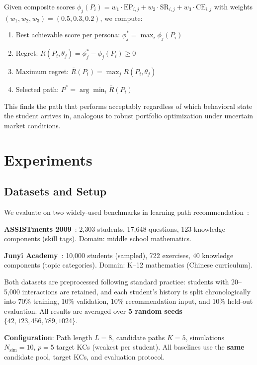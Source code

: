 \documentclass[runningheads]{llncs}
\begin{document}
Given composite scores $\phi_j(P_i) = w_1 \cdot \text{EP}_{i,j} + w_2 \cdot \text{SR}_{i,j} + w_3 \cdot \text{CE}_{i,j}$ with weights $(w_1, w_2, w_3) = (0.5, 0.3, 0.2)$, we compute:

\begin{enumerate}
\item Best achievable score per persona: $\phi_j^* = \max_i \phi_j(P_i)$
\item Regret: $R(P_i, \theta_j) = \phi_j^* - \phi_j(P_i) \geq 0$
\item Maximum regret: $\bar{R}(P_i) = \max_j R(P_i, \theta_j)$
\item Selected path: $P^* = \arg\min_i \bar{R}(P_i)$
\end{enumerate}

This finds the path that performs acceptably regardless of which behavioral state the student arrives in, analogous to robust portfolio optimization under uncertain market conditions.

\section{Experiments}

\subsection{Datasets and Setup}

We evaluate on two widely-used benchmarks in learning path recommendation~\cite{src2023,ibgrpo2026}:

\textbf{ASSISTments 2009}~\cite{assistments}: 2,303 students, 17,648 questions, 123 knowledge components (skill tags). Domain: middle school mathematics.

\textbf{Junyi Academy}~\cite{junyi}: 10,000 students (sampled), 722 exercises, 40 knowledge components (topic categories). Domain: K--12 mathematics (Chinese curriculum).

Both datasets are preprocessed following standard practice: students with 20--5,000 interactions are retained, and each student's history is split chronologically into 70\% training, 10\% validation, 10\% recommendation input, and 10\% held-out evaluation.
All results are averaged over \textbf{5 random seeds} $\{42, 123, 456, 789, 1024\}$.

\textbf{Configuration}: Path length $L=8$, candidate paths $K=5$, simulations $N_{\text{sim}}=10$, $p=5$ target KCs (weakest per student). All baselines use the \textbf{same} candidate pool, target KCs, and evaluation protocol.
\end{document}
